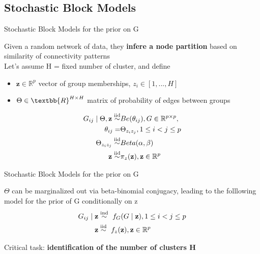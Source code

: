 \subsection{Stochastic Block Models}
\begin{frame}{Stochastic Block Models for the prior on G}

Given a random network of data, they \textbf{infere a node partition} based on similarity of connectivity patterns\\

Let's assume H = fixed number of cluster, and define 
\begin{itemize}
    \item $\mathbf{z} \in \mathbb{R}^p$ vector of group memberships, $z_{i} \in [1,...,H]$
    \item $\Theta \in \textbb{R}^{H\times H}$ matrix of probability of edges between groups
\end{itemize} 
\centering
\begin{align*}
    G_{ij} \mid \Theta,\mathbf{z} \overset{\mathrm{iid}}{\sim} & Be(\theta_{ij}),  G \in \mathbb{R}^{p \times p}, \\
    \theta_{ij} = &\Theta_{z_{i}z_{j}}, 1 \le i < j \le p \\ 
    \Theta_{z_{i}z_{j}} \overset{\mathrm{iid}}{\sim}& Beta(\alpha, \beta)\\
    \mathbf{z} \overset{\mathrm{iid}}{\sim} & \pi_{z}(\mathbf{z}), \mathbf{z} \in \mathbb{R}^p
\end{align*}


\end{frame}




\begin{frame}{Stochastic Block Models for the prior on G}

$\Theta$ can be marginalized out via beta-binomial conjugacy, leading to the folllowing model for the prior of G conditionally on z 
\centering
\begin{align*}
    G_{ij} \mid \mathbf{z} &\ind\  f_{G}(G \mid \mathbf{z}) , 1 \le i < j \le p \\ %
    \mathbf{z} &\iid\ f_{z}(\mathbf{z}), \mathbf{z} \in \mathbb{R}^p
  \end{align*}

 \large Critical task: \textbf{identification of the number of clusters H}

\end{frame}







